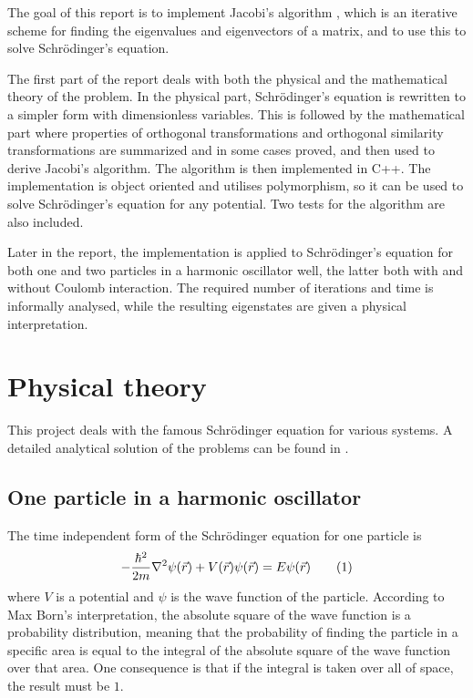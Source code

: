 \documentclass[12pt,english,a4paper]{report}
\newcommand{\eqtag}[1]{\refstepcounter{equation}\tag{\theequation}\label{#1}}
\begin{document}
The goal of this report is to implement Jacobi's algorithm , which is an iterative scheme for finding the eigenvalues and eigenvectors of a matrix, and to use this to solve Schrödinger's equation.

The first part of the report deals with both the physical and the mathematical theory of the problem. In the physical part, Schrödinger's equation is rewritten to a simpler form with dimensionless variables. This is followed by the mathematical part where properties of orthogonal transformations and orthogonal similarity transformations are summarized and in some cases proved, and then used to derive Jacobi's algorithm. The algorithm is then implemented in C++. The implementation is object oriented and utilises polymorphism, so it can be used to solve Schrödinger's equation for any potential. Two tests for the algorithm are also included.

Later in the report, the implementation is applied to Schrödinger's equation for both one and two particles in a harmonic oscillator well, the latter both with and without Coulomb interaction. The required number of iterations and time is informally analysed, while the resulting eigenstates are given a physical interpretation.



\clearpage
\section{Physical theory}
This project deals with the famous Schrödinger equation for various systems. A detailed analytical solution of the problems can be found in \autocite{griffiths}.


\subsection{One particle in a harmonic oscillator}
The time independent form of the Schrödinger equation for one particle is
\[
-\frac{\hbar^2}{2m}\nabla^2\psi(\vec{r}) + V(\vec{r})\psi(\vec{r}) = E\psi(\vec{r}) \eqtag{genslen}
\]
where \(V\) is a potential and \(\psi\) is the wave function of the particle. According to Max Born's interpretation, the absolute square of the wave function is a probability distribution, meaning that the probability of finding the particle in a specific area is equal to the integral of the absolute square of the wave function over that area. One consequence is that if the integral is taken over all of space, the result must be \(1\).
\end{document}

